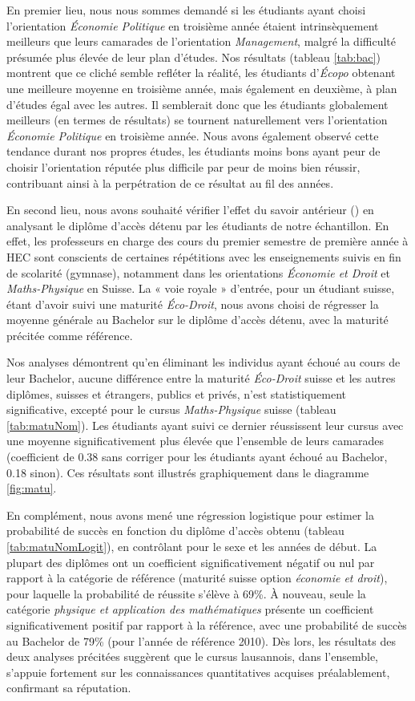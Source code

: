 En premier lieu, nous nous sommes demandé si les étudiants ayant choisi l’orientation \textit{Économie Politique} en troisième année étaient intrinsèquement meilleurs que leurs camarades de l’orientation \textit{Management}, malgré la difficulté présumée plus élevée de leur plan d’études. Nos résultats (tableau \ref{tab:bac}) montrent que ce cliché semble refléter la réalité, les étudiants d'\textit{Écopo} obtenant une meilleure moyenne en troisième année, mais également en deuxième, à plan d’études égal avec les autres. Il semblerait donc que les étudiants globalement meilleurs (en termes de résultats) se tournent naturellement vers l’orientation \textit{Économie Politique} en troisième année. Nous avons également observé cette tendance durant nos propres études, les étudiants moins bons ayant peur de choisir l’orientation réputée plus difficile par peur de moins bien réussir, contribuant ainsi à la perpétration de ce résultat au fil des années.

En second lieu, nous avons souhaité vérifier l’effet du savoir antérieur (\cite{garcia}) en analysant le diplôme d’accès détenu par les étudiants de notre échantillon. En effet, les professeurs en charge des cours du premier semestre de première année à HEC sont conscients de certaines répétitions avec les enseignements suivis en fin de scolarité (gymnase), notamment dans les orientations \textit{Économie et Droit} et \textit{Maths-Physique} en Suisse. La « voie royale » d’entrée, pour un étudiant suisse, étant d’avoir suivi une maturité \textit{Éco-Droit}, nous avons choisi de régresser la moyenne générale au Bachelor sur le diplôme d’accès détenu, avec la maturité précitée comme référence.

Nos analyses démontrent qu’en éliminant les individus ayant échoué au cours de leur Bachelor, aucune différence entre la maturité \textit{Éco-Droit} suisse et les autres diplômes, suisses et étrangers, publics et privés, n’est statistiquement significative, excepté pour le cursus \textit{Maths-Physique} suisse (tableau \ref{tab:matuNom}). Les étudiants ayant suivi ce dernier réussissent leur cursus avec une moyenne significativement plus élevée que l’ensemble de leurs camarades (coefficient de 0.38 sans corriger pour les étudiants ayant échoué au Bachelor, 0.18 sinon). Ces résultats sont illustrés graphiquement dans le diagramme \ref{fig:matu}.

En complément, nous avons mené une régression logistique pour estimer la probabilité de succès en fonction du diplôme d'accès obtenu (tableau \ref{tab:matuNomLogit}), en contrôlant pour le sexe et les années de début. La plupart des diplômes ont un coefficient significativement négatif ou nul par rapport à la catégorie de référence (maturité suisse option \textit{économie et droit}), pour laquelle la probabilité de réussite s'élève à 69\%. À nouveau, seule la catégorie \textit{physique et application des mathématiques} présente un coefficient significativement positif par rapport à la référence, avec une probabilité de succès au Bachelor de 79\% (pour l'année de référence 2010). Dès lors, les résultats des deux analyses précitées suggèrent que le cursus lausannois, dans l'ensemble, s'appuie fortement sur les connaissances quantitatives acquises préalablement, confirmant sa réputation.

